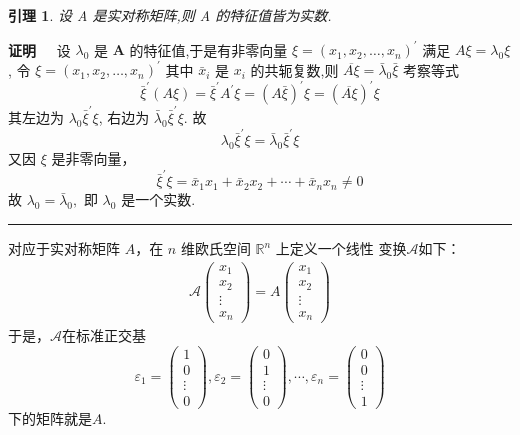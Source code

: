 \documentclass[13pt]{beamer}
\newtheorem{lem}{引理}
\def\qed{\nopagebreak\hfill{\rule{4pt}{7pt}}\medbreak}
\def\pf{{\bf 证明~~ }}
\def\Rn{\mathbb{R}^n}
\begin{document}
\begin{frame}

\begin{lem}
设 A 是实对称矩阵,则 A 的特征值皆为实数. 
\end{lem}
\pf  设 $\lambda_{0}$ 是 $\mathbf{A}$ 的特征值,于是有非零向量
$\xi=\left(x_{1}, x_{2}, \ldots, x_{n}\right)^{\prime}$
满足
${A} {\xi}=\lambda_{0} {\xi}$, 
令
$\xi = \left( {x}_{1}, {x}_{2}, \ldots, {x}_{n} \right)^{\prime}$
其中 $\bar{x}_{i}$ 是 $x_{i}$ 的共轭复数,则 $\overline{A \xi}=\bar{\lambda}_{0} \bar{\xi}$
考察等式
\[
\bar{\xi}^{\prime}(A \xi)=\bar{\xi}^{\prime} A^{\prime} \xi=(A \bar{\xi})^{\prime} \xi=(\overline{A \xi})^{\prime} \xi
\]
其左边为 $\lambda_{0} \bar{\xi}^{\prime} \xi$, 右边为 $\bar{\lambda}_{0} \bar{\xi}^{\prime} \xi$. 故
\[
\lambda_{0} \bar{\xi}^{\prime} \xi = \bar{\lambda}_{0} \bar{\xi}^{\prime} \xi
\]
又因 $\xi$ 是非零向量，
\[
\bar{\xi}^{\prime} \xi=\bar{x}_{1} x_{1}+\bar{x}_{2} x_{2}+\cdots+\bar{x}_{n} x_{n} \neq 0
\]
故 $\lambda_{0}=\bar{\lambda}_{0},$ 即 $\lambda_{0}$ 是一个实数. 
\qed
\end{frame}


\begin{frame}

对应于实对称矩阵 $A$，在 $n$ 维欧氏空间 $\Rn$ 上定义一个线性 变换$\mathscr{A}$如下：
\begin{align}\label{eq-1}
\mathscr{A}\left(\begin{array}{c}
x_{1} \\
x_{2} \\
\vdots \\
x_{n}
\end{array}\right)={A}\left(\begin{array}{c}
x_{1} \\
x_{2} \\
\vdots \\
x_{n}
\end{array}\right)
\end{align}
于是，$\mathscr{A}$在标准正交基
\[
{\varepsilon}_{1}=\left(\begin{array}{c}
1 \\
0 \\
\vdots \\
0
\end{array}\right), {\varepsilon}_{2}=\left(\begin{array}{c}
0 \\
1 \\
\vdots \\
0
\end{array}\right), \cdots, {\varepsilon}_{n}=\left(\begin{array}{c}
0 \\
0 \\
\vdots \\
1
\end{array}\right)
\]
下的矩阵就是$A$. 
\end{frame}
\end{document}
